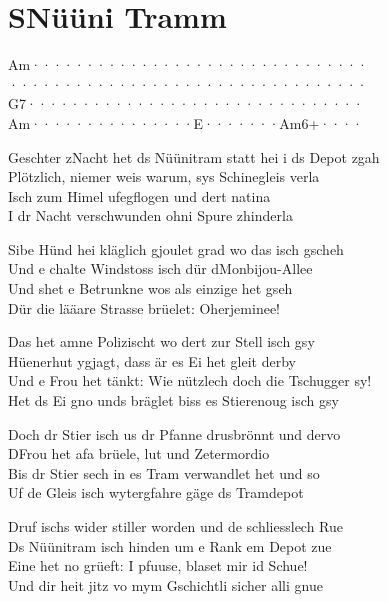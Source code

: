 \documentclass[
  letterpaper,
  twoside=false]{scrbook}
\begin{document}
\hypertarget{snuxfcuxfcni-tramm}{%
\chapter{S\textquotesingle Nüüni Tramm}\label{snuxfcuxfcni-tramm}}

\textbar Am·······\textbar········\textbar········\textbar········\textbar{}\\
\textbar·········\textbar········\textbar········\textbar········\textbar{}\\
\textbar G7·······\textbar········\textbar········\textbar········\textbar{}\\
\textbar Am·······\textbar········\textbar E·······\textbar Am6+····\textbar{}

Geschter z\textquotesingle Nacht het ds Nüünitram statt hei i ds Depot
z\textquotesingle gah\\
Plötzlich, niemer weis warum, sys Schinegleis verla\\
Isch zum Himel ufegflogen und dert natina\\
I dr Nacht verschwunden ohni Spure z\textquotesingle hinderla

Sibe Hünd hei kläglich gjoulet grad wo das isch gscheh\\
Und e chalte Windstoss isch dür d\textquotesingle Monbijou-Allee\\
Und s\textquotesingle het e Betrunkne wos als einzige het gseh\\
Dür die lääare Strasse brüelet: Oherjeminee!

Das het amne Polizischt wo dert zur Stell isch gsy\\
Hüenerhut ygjagt, dass är es Ei het gleit derby\\
Und e Frou het tänkt: Wie nützlech doch die Tschugger sy!\\
Het ds Ei gno und\textquotesingle s bräglet bis\textquotesingle s es
Stierenoug isch gsy

Doch dr Stier isch us dr Pfanne drusbrönnt und dervo\\
D\textquotesingle Frou het afa brüele, lut und Zetermordio\\
Bis dr Stier sech in es Tram verwandlet het und so\\
Uf de Gleis isch wytergfahre gäge ds Tramdepot

Druf ischs wider stiller worden und de schliesslech Rue\\
Ds Nüünitram isch hinden um e Rank em Depot zue\\
Eine het no grüeft: I pfuuse, blaset mir id Schue!\\
Und dir heit jitz vo mym Gschichtli sicher alli gnue
\end{document}
